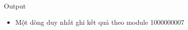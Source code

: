 Output
\begin{itemize}
	\item     Một dòng duy nhất ghi kết quả theo module 1000000007   
\end{itemize}